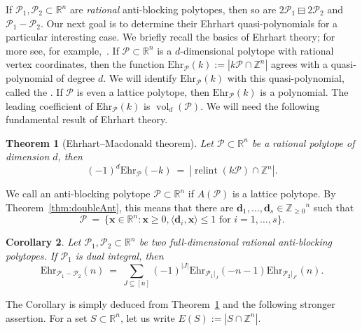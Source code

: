\documentclass[11pt]{amsart}
\newtheorem{thm}{Theorem}[section]
\newtheorem{cor}[thm]{Corollary}
\theoremstyle{definition}
\begin{document}
If ${\mathcal{P}}_1,{\mathcal{P}}_2 \subset {\mathbb{R}}^n$ are \emph{rational} anti-blocking polytopes,
then so are ${{{2{\mathcal{P}}_1} \boxminus {2{\mathcal{P}}_2}}}$ and ${\mathcal{P}}_1 - {\mathcal{P}}_2$. Our next goal is
to determine their Ehrhart quasi-polynomials for a particular interesting
case. We briefly recall the basics of Ehrhart theory; for more see, for
example,~\cite{BR,crt}. If ${\mathcal{P}} \subset {\mathbb{R}}^n$ is a
$d$-dimensional polytope with rational vertex coordinates, then the function
${\mathrm{Ehr}}_{\mathcal{P}}(k) := |k{\mathcal{P}} \cap {\mathbb{Z}}^n|$ agrees with a quasi-polynomial of degree
$d$. We will identify ${\mathrm{Ehr}}_{\mathcal{P}}(k)$ with this quasi-polynomial, called the
{\textbf{\color{black}{Ehrhart quasi-polynomial}}}. If ${\mathcal{P}}$ is even a lattice polytope, then
${\mathrm{Ehr}}_{\mathcal{P}}(k)$ is a polynomial.  The leading coefficient of ${\mathrm{Ehr}}_{\mathcal{P}}(k)$ is
$\operatorname{vol}_d({\mathcal{P}})$. We will need the following fundamental result of Ehrhart
theory.

\begin{thm}[Ehrhart--Macdonald theorem]\label{thm:EM}
    Let ${\mathcal{P}} \subset {\mathbb{R}}^n$ be a rational polytope of dimension $d$, then
    \[
        (-1)^d {\mathrm{Ehr}}_{\mathcal{P}}(-k) \ = \ | \operatorname{relint}(k{\mathcal{P}}) \cap {\mathbb{Z}}^n|.
    \]
\end{thm}

We call an anti-blocking polytope ${\mathcal{P}} \subset {\mathbb{R}}^n$ {\textbf{\color{black}{dual integral}}} if
$A({\mathcal{P}})$ is a lattice polytope. By Theorem~\ref{thm:doubleAnt}, this means
that there are ${\mathbf{d}}_1,\dots,{\mathbf{d}}_s \in {\mathbb{Z}_{\ge0}}^n$ such that
\[
    {\mathcal{P}} \ = \ \{ {\mathbf{x}} \in {\mathbb{R}}^n : {\mathbf{x}} \ge 0, {\langle{{{\mathbf{d}}_i,{\mathbf{x}}}}\rangle} \le 1 \text{ for }
    i=1,\dots,s \}.
\]

\begin{cor}\label{cor:AB_ehrhart}
    Let ${\mathcal{P}}_1,{\mathcal{P}}_2 \subset {\mathbb{R}}^n$ be two full-dimensional rational
    anti-blocking polytopes. If ${\mathcal{P}}_1$ is dual integral, then
    \[
        {\mathrm{Ehr}}_{{\mathcal{P}}_1 - {\mathcal{P}}_2}(n) \ = \ \sum_{J \subseteq [n]}
        (-1)^{|J|}{\mathrm{Ehr}}_{{\mathcal{P}}_1|_J}(-n-1) {\mathrm{Ehr}}_{{\mathcal{P}}_2|_{J^c}}(n).
    \]
\end{cor}

The Corollary is simply deduced from Theorem~\ref{thm:EM} and the following
stronger assertion. For a set $S \subset {\mathbb{R}}^n$, let us write $E(S) := |S \cap
{\mathbb{Z}}^n|$.
\end{document}
